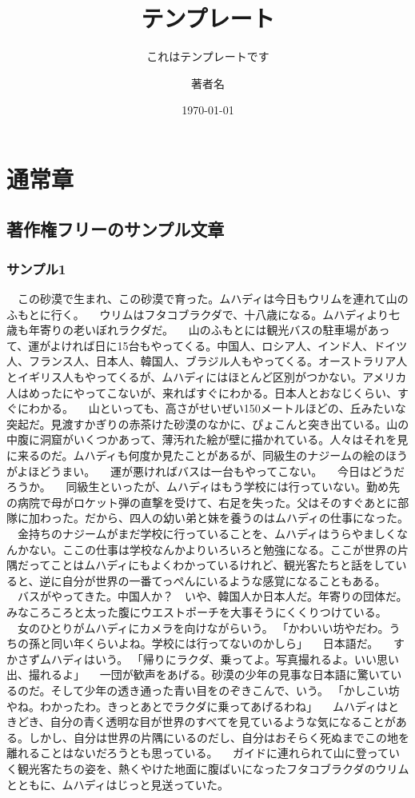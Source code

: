 \documentclass[11pt,a4paper,openright]{ltjsbook}
\title{テンプレート}
\subtitle{これはテンプレートです}
\author{著者名}
\date{\today}
\begin{document}
\maketitle

\tableofcontents

\chapter{通常章}

\section{著作権フリーのサンプル文章}

\subsection{サンプル1}

　この砂漠で生まれ、この砂漠で育った。ムハディは今日もウリムを連れて山のふもとに行く。
　ウリムはフタコブラクダで、十八歳になる。ムハディより七歳も年寄りの老いぼれラクダだ。
　山のふもとには観光バスの駐車場があって、運がよければ日に15台もやってくる。中国人、ロシア人、インド人、ドイツ人、フランス人、日本人、韓国人、ブラジル人もやってくる。オーストラリア人とイギリス人もやってくるが、ムハディにはほとんど区別がつかない。アメリカ人はめったにやってこないが、来ればすぐにわかる。日本人とおなじくらい、すぐにわかる。
　山といっても、高さがせいぜい150メートルほどの、丘みたいな突起だ。見渡すかぎりの赤茶けた砂漠のなかに、ぴょこんと突き出ている。山の中腹に洞窟がいくつかあって、薄汚れた絵が壁に描かれている。人々はそれを見に来るのだ。ムハディも何度か見たことがあるが、同級生のナジームの絵のほうがよほどうまい。
　運が悪ければバスは一台もやってこない。
　今日はどうだろうか。
　同級生といったが、ムハディはもう学校には行っていない。勤め先の病院で母がロケット弾の直撃を受けて、右足を失った。父はそのすぐあとに部隊に加わった。だから、四人の幼い弟と妹を養うのはムハディの仕事になった。
　金持ちのナジームがまだ学校に行っていることを、ムハディはうらやましくなんかない。ここの仕事は学校なんかよりいろいろと勉強になる。ここが世界の片隅だってことはムハディにもよくわかっているけれど、観光客たちと話をしていると、逆に自分が世界の一番てっぺんにいるような感覚になることもある。
　バスがやってきた。中国人か？　いや、韓国人か日本人だ。年寄りの団体だ。みなころころと太った腹にウエストポーチを大事そうにくくりつけている。
　女のひとりがムハディにカメラを向けながらいう。
「かわいい坊やだわ。うちの孫と同い年くらいよね。学校には行ってないのかしら」
　日本語だ。
　すかさずムハディはいう。
「帰りにラクダ、乗ってよ。写真撮れるよ。いい思い出、撮れるよ」
　一団が歓声をあげる。砂漠の少年の見事な日本語に驚いているのだ。そして少年の透き通った青い目をのぞきこんで、いう。
「かしこい坊やね。わかったわ。きっとあとでラクダに乗ってあげるわね」
　ムハディはときどき、自分の青く透明な目が世界のすべてを見ているような気になることがある。しかし、自分は世界の片隅にいるのだし、自分はおそらく死ぬまでこの地を離れることはないだろうとも思っている。
　ガイドに連れられて山に登っていく観光客たちの姿を、熱くやけた地面に腹ばいになったフタコブラクダのウリムとともに、ムハディはじっと見送っていた。
\end{document}
